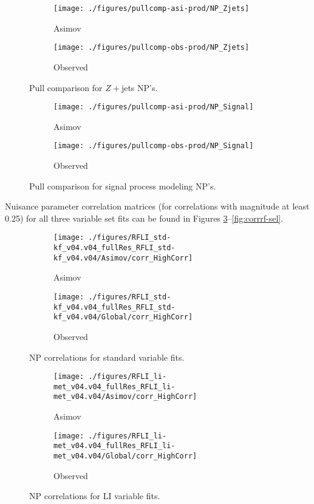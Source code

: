 \begin{figure}[!htbp]\captionsetup{justification=centering}\begin{subfigure}[t]{0.490000\textwidth}\centering\texttt{[image: ./figures/pullcomp-asi-prod/NP\_Zjets]}\caption{Asimov}\end{subfigure}
\begin{subfigure}[t]{0.490000\textwidth}\centering\texttt{[image: ./figures/pullcomp-obs-prod/NP\_Zjets]}\caption{Observed}\end{subfigure}
  \caption{Pull comparison for $Z+$jets NP's.}
  \label{fig:PullComparisons-Zjets}
\end{figure}

\begin{figure}[!htbp]\captionsetup{justification=centering}
\begin{subfigure}[t]{0.490000\textwidth}\centering\texttt{[image: ./figures/pullcomp-asi-prod/NP\_Signal]}\caption{Asimov}\end{subfigure}
\begin{subfigure}[t]{0.490000\textwidth}\centering\texttt{[image: ./figures/pullcomp-obs-prod/NP\_Signal]}\caption{Observed}\end{subfigure}
  \caption{Pull comparison for signal process modeling NP's.}
  \label{fig:PullComparisons-Signal}
\end{figure}

Nuisance parameter correlation matrices (for correlations with magnitude at least 0.25) for all three variable set fits can be found in Figures \ref{fig:corrstd-kf}--\ref{fig:corrrf-sel}.

\begin{figure}[!htbp]\captionsetup{justification=centering}
\begin{subfigure}[t]{0.49000\textwidth}\centering\texttt{[image: ./figures/RFLI\_std-kf\_v04.v04\_fullRes\_RFLI\_std-kf\_v04.v04/Asimov/corr\_HighCorr]}\caption{Asimov}\end{subfigure}
\begin{subfigure}[t]{0.49000\textwidth}\centering\texttt{[image: ./figures/RFLI\_std-kf\_v04.v04\_fullRes\_RFLI\_std-kf\_v04.v04/Global/corr\_HighCorr]}\caption{Observed}\end{subfigure}
  \caption{NP correlations for standard variable fits.}
  \label{fig:corrstd-kf}
\end{figure}


\begin{figure}[!htbp]\captionsetup{justification=centering}
\begin{subfigure}[t]{0.49000\textwidth}\centering\texttt{[image: ./figures/RFLI\_li-met\_v04.v04\_fullRes\_RFLI\_li-met\_v04.v04/Asimov/corr\_HighCorr]}\caption{Asimov}\end{subfigure}
\begin{subfigure}[t]{0.49000\textwidth}\centering\texttt{[image: ./figures/RFLI\_li-met\_v04.v04\_fullRes\_RFLI\_li-met\_v04.v04/Global/corr\_HighCorr]}\caption{Observed}\end{subfigure}
  \caption{NP correlations for LI variable fits.}
  \label{fig:corrli-met}
\end{figure}


